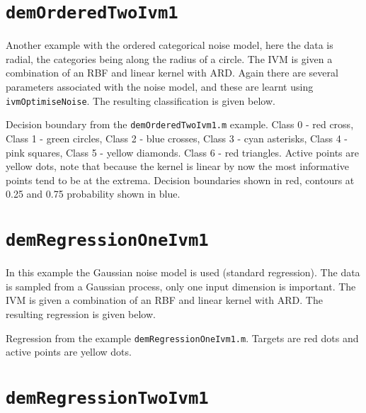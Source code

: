 \section{\texttt{demOrderedTwoIvm1}}

Another example with the ordered categorical noise model, here the data is radial, the categories being along the radius of a circle. The IVM is given a combination of an RBF and linear kernel with ARD. Again there are several parameters associated with the noise model, and these are learnt using \texttt{ivmOptimiseNoise}. The resulting classification is given below.



\begin{center}

Decision boundary from the \texttt{demOrderedTwoIvm1.m} example. Class 0 - red cross, Class 1 - green circles, Class 2 - blue crosses, Class 3 - cyan asterisks, Class 4 - pink squares, Class 5 - yellow diamonds. Class 6 - red triangles. Active points are yellow dots, note that because the kernel is linear by now the most informative points tend to be at the extrema. Decision boundaries shown in red, contours at 0.25 and 0.75 probability shown in blue.\end{center}





\section{\texttt{demRegressionOneIvm1}}

In this example the Gaussian noise model is used (standard regression). The data is sampled from a Gaussian process, only one input dimension is important. The IVM is given a combination of an RBF and linear kernel with ARD. The resulting regression is given below.



\begin{center}

Regression from the example \texttt{demRegressionOneIvm1.m}. Targets are red dots and active points are yellow dots.\end{center}



\section{\texttt{demRegressionTwoIvm1}}

